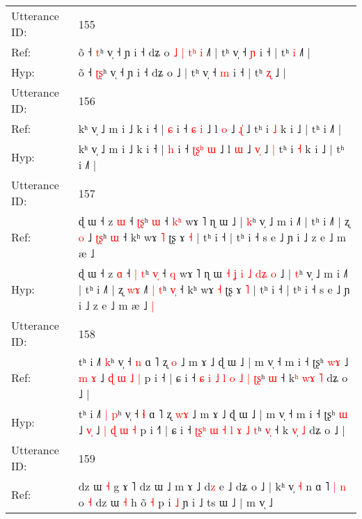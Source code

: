 \documentclass[10pt]{article}
\DeclareRobustCommand{\hl}[1]{{\textcolor{red}{#1}}}
\begin{document}
\begin{longtable}{ll}
 \\
\midrule
Utterance ID: & 155 \\
Ref: & õ ˧ \hl{}\hl{t}ʰ v̩ ˧ ɲ i ˧ dʑ o\hl{ }\hl{˩}\hl{ }\hl{|}\hl{ }\hl{t}\hl{ʰ}\hl{ }\hl{i} ˩\hl{˥} | tʰ v̩ ˧ \hl{ɲ} i ˧ | tʰ \hl{i} ˩\hl{˥} |
 \\
Hyp: & õ ˧ \hl{ʈ}\hl{ʂ}ʰ v̩ ˧ ɲ i ˧ dʑ o\hl{}\hl{}\hl{}\hl{}\hl{}\hl{}\hl{}\hl{}\hl{} ˩\hl{} | tʰ v̩ ˧ \hl{m} i ˧ | tʰ \hl{ʐ} ˩\hl{} |
 \\
\midrule
Utterance ID: & 156 \\
Ref: & kʰ v̩ ˩ m i ˩ k i ˧ | \hl{ɕ} i ˧ \hl{}\hl{}\hl{ɕ} \hl{i} ˩ l \hl{o} ˩ \hl{ɻ}\hl{̍} ˩\hl{}\hl{} tʰ i \hl{˩} k i ˩ | tʰ i ˩˥ |
 \\
Hyp: & kʰ v̩ ˩ m i ˩ k i ˧ | \hl{h} i ˧ \hl{ʈ}\hl{ʂ}\hl{ʰ} \hl{ɯ} ˩ l \hl{ɯ} ˩ \hl{v}\hl{̩} ˩\hl{ }\hl{|} tʰ i \hl{˧} k i ˩ | tʰ i ˩˥ |
 \\
\midrule
Utterance ID: & 157 \\
Ref: & ɖ ɯ ˧ z \hl{ɯ} ˧ \hl{}\hl{ʈ}\hl{ʂ}ʰ \hl{}\hl{ɯ} ˧ \hl{k}\hl{ʰ} wɤ ˥ ɳ ɯ\hl{}\hl{}\hl{}\hl{}\hl{}\hl{}\hl{}\hl{}\hl{}\hl{}\hl{}\hl{}\hl{} ˩ | \hl{k}ʰ v̩ ˩ m i ˩˥ | tʰ i ˩˥ | ʐ \hl{}\hl{o} ˩\hl{} \hl{}\hl{ʈ}\hl{ʂ}ʰ \hl{}\hl{ɯ} ˧ kʰ wɤ \hl{˥} ʈʂ ɤ \hl{˧} | tʰ i ˧ | tʰ i ˧ s e ˩ ɲ i ˩ z e ˩ m æ ˩\hl{}\hl{}
 \\
Hyp: & ɖ ɯ ˧ z \hl{ɑ} ˧ \hl{|}\hl{ }\hl{t}ʰ \hl{v}\hl{̩} ˧ \hl{}\hl{q} wɤ ˥ ɳ ɯ\hl{ }\hl{˧}\hl{ }\hl{ʝ}\hl{ }\hl{i}\hl{ }\hl{˩}\hl{ }\hl{d}\hl{ʑ}\hl{ }\hl{o} ˩ | \hl{t}ʰ v̩ ˩ m i ˩˥ | tʰ i ˩˥ | ʐ \hl{w}\hl{ɤ} ˩\hl{˥} \hl{|}\hl{ }\hl{t}ʰ \hl{v}\hl{̩} ˧ kʰ wɤ \hl{˧} ʈʂ ɤ \hl{˥} | tʰ i ˧ | tʰ i ˧ s e ˩ ɲ i ˩ z e ˩ m æ ˩\hl{ }\hl{|}
 \\
\midrule
Utterance ID: & 158 \\
Ref: & tʰ i ˩˥\hl{}\hl{} \hl{k}ʰ v̩ ˧ \hl{n} ɑ ˥ ʐ \hl{}\hl{o} ˩ m ɤ ˩ ɖ ɯ ˩ | m v̩ ˧ m i ˧ ʈʂʰ \hl{w}\hl{ɤ} ˩ \hl{m}\hl{ }\hl{ɤ} ˩ \hl{ɖ} \hl{ɯ} \hl{˩} \hl{|} p i ˧\hl{} | ɕ i ˧ \hl{ɕ}\hl{ }\hl{i} \hl{˩} \hl{l} \hl{o} \hl{˩} \hl{|} \hl{ʈ}\hl{ʂ}ʰ \hl{}\hl{ɯ} ˧ k\hl{ʰ} \hl{w}\hl{ɤ} \hl{˥} dʑ o ˩ |
 \\
Hyp: & tʰ i ˩˥\hl{ }\hl{|} \hl{p}ʰ v̩ ˧ \hl{ɬ} ɑ ˥ ʐ \hl{w}\hl{ɤ} ˩ m ɤ ˩ ɖ ɯ ˩ | m v̩ ˧ m i ˧ ʈʂʰ \hl{}\hl{ɯ} ˩ \hl{}\hl{v}\hl{̩} ˩ \hl{|} \hl{ɖ} \hl{ɯ} \hl{˧} p i ˧\hl{˥} | ɕ i ˧ \hl{ʈ}\hl{ʂ}\hl{ʰ} \hl{ɯ} \hl{˧} \hl{l} \hl{ɤ} \hl{˩} \hl{}\hl{t}ʰ \hl{v}\hl{̩} ˧ k\hl{} \hl{v}\hl{̩} \hl{˩} dʑ o ˩ |
 \\
\midrule
Utterance ID: & 159 \\
Ref: & dz ɯ \hl{˧} g ɤ ˥\hl{}\hl{} dz ɯ ˩ m ɤ ˩ d\hl{z} e ˩ dʑ o ˩ | kʰ v̩ \hl{˧} n ɑ ˥\hl{ }\hl{|} \hl{n} o \hl{˧} dz ɯ \hl{˧} h o\hl{}\hl{}\hl{}\hl{}\hl{̃} \hl{˧} p i \hl{˩} ɲ i ˩ ts ɯ ˩ | m v̩ ˩

\end{longtable}
\end{document}
